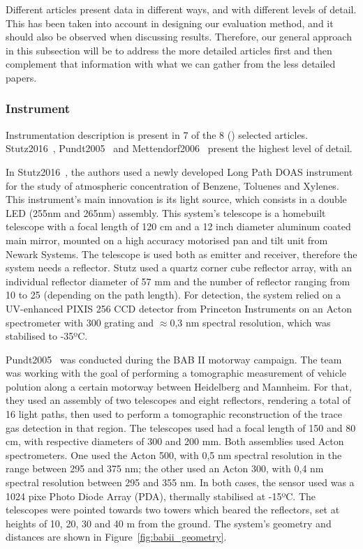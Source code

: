 Different articles present data in different ways, and with different
levels of detail. This has been taken into account in designing our
evaluation method, and it should also be observed when discussing
results. Therefore, our general approach in this subsection will be to
address the more detailed articles first and then complement that
information with what we can gather from the less detailed papers.

\subsubsection{Instrument}
\label{ssub:instrument}

Instrumentation description is present in 7 of the 8
(\cite{Hartl2006,Laepple2004,
Mettendorf2006,Olaguer2017,Poehler,Pundt2005, Stutz2016}) selected
articles. Stutz2016~\cite{Stutz2016}, Pundt2005~\cite{Pundt2005} and
Mettendorf2006~\cite{Mettendorf2006} present the highest level of
detail.

In Stutz2016~\cite{Stutz2016}, the authors used a newly developed Long
Path DOAS instrument for the study of atmospheric concentration of
Benzene, Toluenes and Xylenes. This instrument's main innovation is its
light source, which consists in a double LED (255nm and 265nm) assembly.
This system's telescope is a homebuilt telescope with a focal length of
120 cm and a 12 inch diameter aluminum coated main mirror, mounted on a
high accuracy motorised pan and tilt unit from Newark Systems. The
telescope is used both as emitter and receiver, therefore the system
needs a reflector. Stutz used a quartz corner cube reflector array,
with an individual reflector diameter of 57 mm and the number of
reflector ranging from 10 to 25 (depending on the path length). For
detection, the system relied on a UV-enhanced PIXIS 256 CCD detector
from Princeton Instruments on an Acton spectrometer with 300 grating and
$\approx$0,3 nm spectral resolution, which was stabilised to -35ºC.

Pundt2005~\cite{Pundt2005} was conducted during the BAB II motorway
campaign. The team was working with the goal of performing a tomographic
measurement of vehicle polution along a certain motorway between
Heidelberg and Mannheim. For that, they used an assembly of two
telescopes and eight reflectors, rendering a total of 16 light paths,
then used to perform a tomographic reconstruction of the trace gas
detection in that region. The telescopes used had a focal length of 150
and 80 cm, with respective diameters of 300 and 200 mm. Both assemblies
used Acton spectrometers. One used the Acton 500, with 0,5 nm spectral
resolution in the range between 295 and 375 nm; the other used an Acton
300, with 0,4 nm spectral resolution between 295 and 355 nm. In both
cases, the sensor used was a 1024 pixe Photo Diode Array (PDA),
thermally stabilised at -15ºC. The telescopes were pointed towards two
towers which beared the reflectors, set at heights of 10, 20, 30 and 40
m from the ground. The system's geometry and distances are shown in
Figure~\ref{fig:babii_geometry}.

